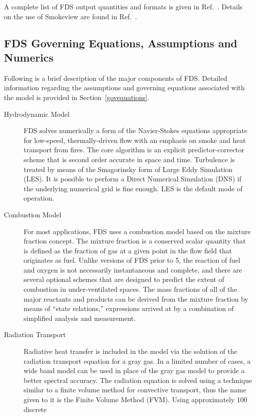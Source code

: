 \documentclass[11pt]{book}
\begin{document}
A complete list of FDS output quantities and formats is given in Ref.~\cite{FDS_Users_Guide_5}.
Details on the use of Smokeview are found in Ref.~\cite{Smokeview_Users_Guide_5}.




\subsection{FDS Governing Equations, Assumptions and Numerics}

Following is a brief description of
the major components of FDS. Detailed information regarding the assumptions and governing equations associated
with the model is provided in Section~\ref{govequations}.
\begin{description}
\item[Hydrodynamic Model] FDS
solves numerically a form of the Navier-Stokes equations appropriate
for low-speed, thermally-driven flow with an emphasis on
smoke and heat transport from fires. The core algorithm is an
explicit predictor-corrector scheme that is second order accurate in space
and time. Turbulence is treated by means of the Smagorinsky form of
Large Eddy Simulation (LES). It is possible to perform a Direct
Numerical Simulation (DNS) if the underlying numerical grid is fine
enough. LES is the default mode of operation.
\item[Combustion Model]
For most applications, FDS uses a combustion model based on the mixture fraction concept.
The mixture fraction is a conserved scalar quantity
that is defined as the
fraction of gas at a given point in the flow field that originates as fuel.
Unlike versions of FDS prior to 5, the reaction of fuel and oxygen is not necessarily instantaneous and complete, and there are
several optional schemes that are designed to predict the extent of combustion in under-ventilated spaces.
The mass fractions of all of the major reactants and products can
be derived from the mixture fraction by means of ``state relations,''
expressions arrived at by a
combination of simplified analysis and measurement.
\item[Radiation Transport] Radiative heat transfer is included in the
model via the solution of the radiation transport equation for a gray
gas. In a limited number of cases, a wide band model can be used in
place of the gray gas model to provide a better spectral accuracy. The
radiation equation is solved using a technique similar to a finite
volume method for convective transport, thus the name given to it is
the Finite Volume Method (FVM). Using approximately 100 discrete

\end{description}
\end{document}
